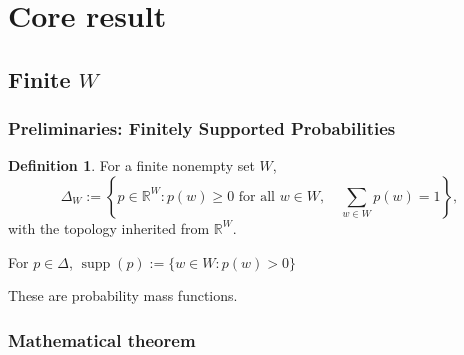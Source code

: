 \documentclass[11pt]{article}
\newtheorem{theorem}{Theorem}[section]
\theoremstyle{definition}
\newtheorem{definition}[theorem]{Definition}
\theoremstyle{remark}
\begin{document}
\section{Core result}



\subsection{Finite $W$}

\subsubsection{Preliminaries: Finitely Supported Probabilities}

\begin{definition}
For a finite nonempty set $W$,
\[
\Delta_W
:= \left\{p\in\mathbb{R}^W :
p(w)\geq 0 \text{ for all } w\in W,\quad
\sum_{w\in W}p(w)=1\right\},
\]
with the topology inherited from $\mathbb{R}^W$.

For $p\in \Delta$, $\operatorname{supp}(p):=\{w\in W:p(w)>0\}$
\end{definition}

These are probability mass functions. 

%
%
%
%
	

\subsubsection{Mathematical theorem}
\end{document}
